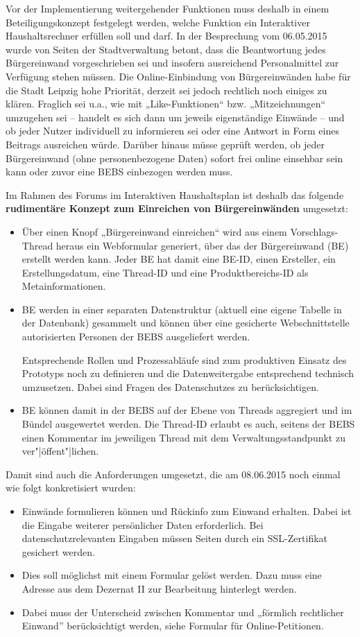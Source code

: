 \documentclass[11pt,a4paper,twoside]{article}
\begin{document}
Vor der Implementierung weitergehender Funktionen muss deshalb in einem
Beteiligungskonzept festgelegt werden, welche Funktion ein Interaktiver
Haushaltsrechner erfüllen soll und darf. In der Besprechung vom 06.05.2015
wurde von Seiten der Stadtverwaltung betont, dass die Beantwortung jedes
Bürgereinwand vorgeschrieben sei und insofern ausreichend Personalmittel zur
Verfügung stehen müssen. Die Online-Einbindung von Bürgereinwänden habe für
die Stadt Leipzig hohe Priorität, derzeit sei jedoch rechtlich noch einiges zu
klären. Fraglich sei u.a., wie mit „Like-Funktionen“ bzw. „Mitzeichnungen“
umzugehen sei -- handelt es sich dann um jeweils eigenständige Einwände -- und
ob jeder Nutzer individuell zu informieren sei oder eine Antwort in Form eines
Beitrags ausreichen würde. Darüber hinaus müsse geprüft werden, ob jeder
Bürgereinwand (ohne personenbezogene Daten) sofort frei online einsehbar sein
kann oder zuvor eine BEBS einbezogen werden muss.

Im Rahmen des Forums im Interaktiven Haushaltsplan ist deshalb das folgende
\textbf{rudimentäre Konzept zum Einreichen von Bürgereinwänden} umgesetzt:
\begin{itemize}
\item Über einen Knopf „Bürgereinwand einreichen“ wird aus einem
  Vorschlags-Thread heraus ein Webformular generiert, über das der
  Bürgereinwand (BE) erstellt werden kann.  Jeder BE hat damit eine BE-ID,
  einen Ersteller, ein Erstellungsdatum, eine Thread-ID und eine
  Produktbereichs-ID als Metainformationen.  
\item BE werden in einer separaten Datenstruktur (aktuell eine eigene Tabelle
  in der Datenbank) gesammelt und können über eine gesicherte Webschnittstelle
  autorisierten Personen der BEBS ausgeliefert werden.  

  Entsprechende Rollen und Prozessabläufe sind zum produktiven Einsatz des
  Prototyps noch zu definieren und die Datenweitergabe entsprechend technisch
  umzusetzen.  Dabei sind Fragen des Datenschutzes zu berücksichtigen.
\item BE können damit in der BEBS auf der Ebene von Threads aggregiert und im
  Bündel ausgewertet werden.  Die Thread-ID erlaubt es auch, seitens der BEBS
  einen Kommentar im jeweiligen Thread mit dem Verwaltungsstandpunkt zu
  ver"|öffent"|lichen. 
\end{itemize}
Damit sind auch die Anforderungen umgesetzt, die am 08.06.2015 noch einmal wie
folgt konkretisiert wurden:
\begin{itemize}
\item Einwände formulieren können und Rückinfo zum Einwand erhalten. Dabei ist
  die Eingabe weiterer persönlicher Daten erforderlich. Bei
  datenschutzrelevanten Eingaben müssen Seiten durch ein SSL-Zertifikat
  gesichert werden. 
\item Dies soll möglichst mit einem Formular gelöst werden. Dazu muss eine
  Adresse aus dem Dezernat II zur Bearbeitung hinterlegt werden.
\item Dabei muss der Unterscheid zwischen Kommentar und „förmlich rechtlicher
  Einwand” berücksichtigt werden, siehe Formular für Online-Petitionen.
\end{itemize}
\end{document}
